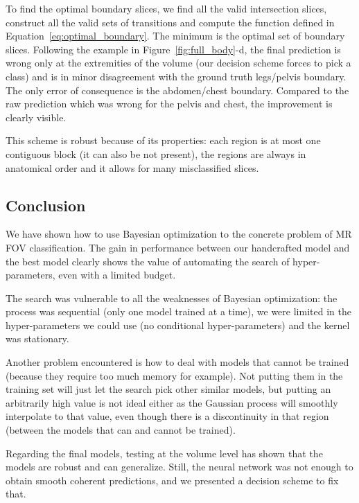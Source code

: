 To find the optimal boundary slices, we find all the valid intersection slices, construct all the valid sets of transitions and compute the function defined in Equation~\ref{eq:optimal_boundary}. The minimum is the optimal set of boundary slices. Following the example in Figure~\ref{fig:full_body}-d, the final prediction is wrong only at the extremities of the volume (our decision scheme forces to pick a class) and is in minor disagreement with the ground truth legs/pelvis boundary. The only error of consequence is the abdomen/chest boundary. Compared to the raw prediction which was wrong for the pelvis and chest, the improvement is clearly visible.

This scheme is robust because of its properties: each region is at most one contiguous block (it can also be not present), the regions are always in anatomical order and it allows for many misclassified slices. 

\subsection{Conclusion}

We have shown how to use Bayesian optimization to the concrete problem of MR FOV classification. The gain in performance between our handcrafted model and the best model clearly shows the value of automating the search of hyper-parameters, even with a limited budget.

The search was vulnerable to all the weaknesses of Bayesian optimization: the process was sequential (only one model trained at a time), we were limited in the hyper-parameters we could use (no conditional hyper-parameters) and the kernel was stationary. 

Another problem encountered is how to deal with models that cannot be trained (because they require too much memory for example). Not putting them in the training set will just let the search pick other similar models, but putting an arbitrarily high value is not ideal either as the Gaussian process will smoothly interpolate to that value, even though there is a discontinuity in that region (between the models that can and cannot be trained).

Regarding the final models, testing at the volume level has shown that the models are robust and can generalize. Still, the neural network was not enough to obtain smooth coherent predictions, and we presented a decision scheme to fix that.

